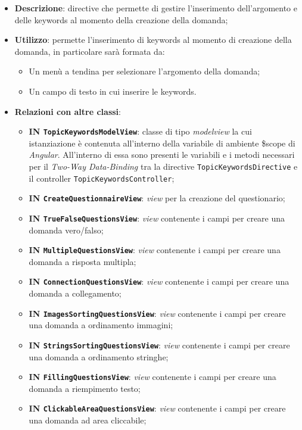 \begin{itemize}
	\item \textbf{Descrizione}: directive che permette di gestire l'inserimento dell'argomento e delle keywords al momento della creazione della domanda;
	\item \textbf{Utilizzo}: permette l'inserimento di keywords al momento di creazione della domanda, in particolare sarà formata da:
	\begin{itemize}
		\item Un menù a tendina per selezionare l'argomento della domanda;
		\item Un campo di testo in cui inserire le keywords.
	\end{itemize}
	\item \textbf{Relazioni con altre classi}:
	\begin{itemize}
		\item \textbf{IN \texttt{TopicKeywordsModelView}}: classe di tipo \textit{modelview} la cui istanziazione è contenuta all'interno della variabile di ambiente \$scope di \textit{Angular}. All'interno di essa sono presenti le variabili e i metodi necessari per il \textit{Two-Way Data-Binding} tra la directive \texttt{TopicKeywordsDirective} e il controller \texttt{TopicKeywordsController};
		\item \textbf{IN \texttt{CreateQuestionnaireView}}: \textit{view} per la creazione del questionario; 
		\item \textbf{IN \texttt{TrueFalseQuestionsView}}: \textit{view} contenente i campi per creare una domanda vero/falso; 
		\item \textbf{IN \texttt{MultipleQuestionsView}}: \textit{view} contenente i campi per creare una domanda a risposta multipla;
		\item \textbf{IN \texttt{ConnectionQuestionsView}}: \textit{view} contenente i campi per creare una domanda a collegamento;
		\item \textbf{IN \texttt{ImagesSortingQuestionsView}}: \textit{view} contenente i campi per creare una domanda a ordinamento immagini;
		\item \textbf{IN \texttt{StringsSortingQuestionsView}}: \textit{view} contenente i campi per creare una domanda a ordinamento stringhe;
		\item \textbf{IN \texttt{FillingQuestionsView}}: \textit{view} contenente i campi per creare una domanda a riempimento testo;
		\item \textbf{IN \texttt{ClickableAreaQuestionsView}}: \textit{view} contenente i campi per creare una domanda ad area cliccabile;

\end{itemize}
\end{itemize}
